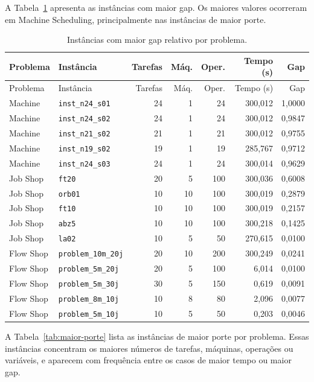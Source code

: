 \documentclass[12pt,a4paper]{article}
\begin{document}
A Tabela~\ref{tab:maior-gap} apresenta as instâncias com maior gap. Os maiores
valores ocorreram em Machine Scheduling, principalmente nas instâncias de maior
porte.

\begin{longtable}{llrrrrr}
\caption{Instâncias com maior gap relativo por problema.}
\label{tab:maior-gap}\\
\toprule
Problema & Instância & Tarefas & Máq. & Oper. & Tempo (s) & Gap \\
\midrule
\endfirsthead
\toprule
Problema & Instância & Tarefas & Máq. & Oper. & Tempo (s) & Gap \\
\midrule
\endhead
Machine & \texttt{inst\_n24\_s01} & 24 & 1 & 24 & 300,012 & 1,0000 \\
Machine & \texttt{inst\_n24\_s02} & 24 & 1 & 24 & 300,012 & 0,9847 \\
Machine & \texttt{inst\_n21\_s02} & 21 & 1 & 21 & 300,012 & 0,9755 \\
Machine & \texttt{inst\_n19\_s02} & 19 & 1 & 19 & 285,767 & 0,9712 \\
Machine & \texttt{inst\_n24\_s03} & 24 & 1 & 24 & 300,014 & 0,9629 \\
Job Shop & \texttt{ft20} & 20 & 5 & 100 & 300,036 & 0,6008 \\
Job Shop & \texttt{orb01} & 10 & 10 & 100 & 300,019 & 0,2879 \\
Job Shop & \texttt{ft10} & 10 & 10 & 100 & 300,019 & 0,2157 \\
Job Shop & \texttt{abz5} & 10 & 10 & 100 & 300,218 & 0,1425 \\
Job Shop & \texttt{la02} & 10 & 5 & 50 & 270,615 & 0,0100 \\
Flow Shop & \texttt{problem\_10m\_20j} & 20 & 10 & 200 & 300,249 & 0,0241 \\
Flow Shop & \texttt{problem\_5m\_20j} & 20 & 5 & 100 & 6,014 & 0,0100 \\
Flow Shop & \texttt{problem\_5m\_30j} & 30 & 5 & 150 & 0,619 & 0,0091 \\
Flow Shop & \texttt{problem\_8m\_10j} & 10 & 8 & 80 & 2,096 & 0,0077 \\
Flow Shop & \texttt{problem\_5m\_10j} & 10 & 5 & 50 & 0,203 & 0,0046 \\
\bottomrule
\end{longtable}

A Tabela~\ref{tab:maior-porte} lista as instâncias de maior porte por problema.
Essas instâncias concentram os maiores números de tarefas, máquinas, operações
ou variáveis, e aparecem com frequência entre os casos de maior tempo ou maior
gap.
\end{document}
